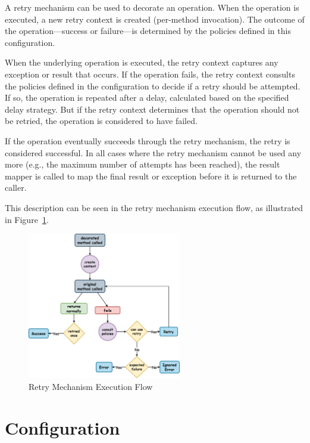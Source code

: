 A retry mechanism can be used to decorate an operation.
When the operation is executed, a new retry context is created (per-method invocation).
The outcome of the operation—success or failure—is determined by the policies defined in this configuration.

When the underlying operation is executed, the retry context captures any exception or result that occurs.
If the operation fails,
the retry context consults the policies defined in the configuration to decide if a retry should be attempted.
If so, the operation is repeated after a delay, calculated based on the specified delay strategy.
But if the retry context determines that the operation should not be retried,
the operation is considered to have failed.

If the operation eventually succeeds through the retry mechanism, the retry is considered successful.
In all cases where the retry mechanism cannot be used any more
(e.g., the maximum number of attempts has been reached),
the result mapper is called to map the final result or exception before it is returned to the caller.

This description can be seen in the retry mechanism execution flow,
as illustrated in Figure~\ref{fig:retry-execution-flow}.

\begin{figure}[!htb]
    \centering
    \includegraphics[width=0.6\textwidth]{../figures/04_retry-execution-flow}
    \caption{Retry Mechanism Execution Flow}
    \label{fig:retry-execution-flow}
\end{figure}


\section{Configuration}\label{sec:retry-configuration}

